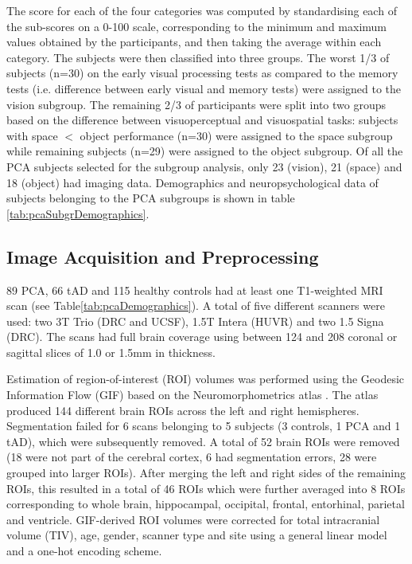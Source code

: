 The score for each of the four categories was computed by standardising each of the sub-scores on a 0-100 scale, corresponding to the minimum and maximum values obtained by the participants, and then taking the average within each category. The subjects were then classified into three groups. The worst 1/3 of subjects (n=30) on the early visual processing tests as compared to the memory tests (i.e. difference between early visual and memory tests) were assigned to the vision subgroup. The remaining 2/3 of participants were split into two groups based on the difference between visuoperceptual and visuospatial tasks: subjects with space $<$ object performance (n=30) were assigned to the space subgroup while remaining subjects (n=29) were assigned to the object subgroup. Of all the PCA subjects selected for the subgroup analysis, only 23 (vision), 21 (space) and 18 (object) had imaging data. Demographics and neuropsychological data of subjects belonging to the PCA subgroups is shown in table \ref{tab:pcaSubgrDemographics}.


\subsection{Image Acquisition and Preprocessing}
\label{sec:pcaImageAcq}


89 PCA, 66 tAD and 115 healthy controls had at least one T1-weighted MRI scan (see Table\ref{tab:pcaDemographics}). A total of five different scanners were used: two 3T Trio (DRC and UCSF), 1.5T Intera (HUVR) and two 1.5 Signa (DRC). The scans had full brain coverage using between 124 and 208 coronal or sagittal slices of 1.0 or 1.5mm in thickness.

Estimation of region-of-interest (ROI) volumes was performed using the Geodesic Information Flow (GIF) \cite{cardoso2015geodesic} based on the Neuromorphometrics atlas \cite{neuromorphometrics}. The atlas produced 144 different brain ROIs across the left and right hemispheres. Segmentation failed for 6 scans belonging to 5 subjects (3 controls, 1 PCA and 1 tAD), which were subsequently removed. A total of 52 brain ROIs were removed (18 were not part of the cerebral cortex, 6 had segmentation errors, 28 were grouped into larger ROIs). After merging the left and right sides of the remaining ROIs, this resulted in a total of 46 ROIs which were further averaged into 8 ROIs corresponding to whole brain, hippocampal, occipital, frontal, entorhinal, parietal and ventricle. GIF-derived ROI volumes were corrected for total intracranial volume (TIV), age, gender, scanner type and site using a general linear model and a one-hot encoding scheme.

